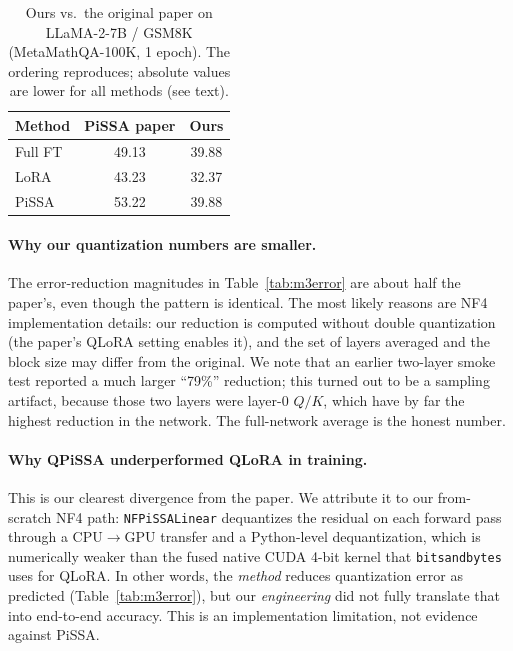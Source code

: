 \documentclass[mlmain]{jmlr}
\begin{document}
\begin{table}[H]
\centering
\caption{\footnotesize Ours vs.\ the original paper on LLaMA-2-7B / GSM8K (MetaMathQA-100K, 1 epoch). The ordering reproduces; absolute values are lower for all methods (see text).}
\label{tab:vspaper}
\begin{tabular}{lcc}
\toprule
Method & PiSSA paper & Ours \\
\midrule
Full FT & 49.13 & 39.88 \\
LoRA & 43.23 & 32.37 \\
PiSSA & 53.22 & 39.88 \\
\bottomrule
\end{tabular}
\end{table}

\paragraph{Why our quantization numbers are smaller.} The error-reduction magnitudes in Table~\ref{tab:m3error} are about half the paper's, even though the pattern is identical. The most likely reasons are NF4 implementation details: our reduction is computed without double quantization (the paper's QLoRA setting enables it), and the set of layers averaged and the block size may differ from the original. We note that an earlier two-layer smoke test reported a much larger ``79\%'' reduction; this turned out to be a sampling artifact, because those two layers were layer-0 $Q/K$, which have by far the highest reduction in the network. The full-network average is the honest number.

\paragraph{Why QPiSSA underperformed QLoRA in training.} This is our clearest divergence from the paper. We attribute it to our from-scratch NF4 path: \texttt{NFPiSSALinear} dequantizes the residual on each forward pass through a CPU$\to$GPU transfer and a Python-level dequantization, which is numerically weaker than the fused native CUDA 4-bit kernel that \texttt{bitsandbytes} uses for QLoRA. In other words, the \emph{method} reduces quantization error as predicted (Table~\ref{tab:m3error}), but our \emph{engineering} did not fully translate that into end-to-end accuracy. This is an implementation limitation, not evidence against PiSSA.
\end{document}
